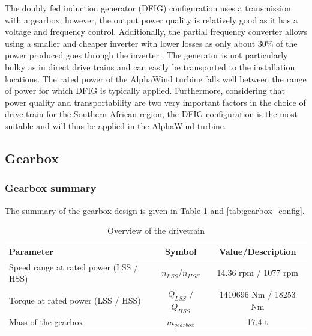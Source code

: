 The doubly fed induction generator (DFIG) configuration uses a transmission with a gearbox; however, the output power quality is relatively good as it has a voltage and frequency control. Additionally, the partial frequency converter allows using a smaller and cheaper inverter with lower losses as only about 30\% of the power produced goes through the inverter \cite{hau}. The generator is not particularly bulky as in direct drive trains and can easily be transported to the installation locations. The rated power of the AlphaWind turbine falls well between the range of power for which DFIG is typically applied. Furthermore, considering that power quality and transportability are two very important factors in the choice of drive train for the Southern African region, the DFIG configuration is the most suitable and will thus be applied in the AlphaWind turbine.


\subsection{Gearbox}

\subsubsection{Gearbox summary}

The summary of the gearbox design is given in Table \ref{tab:overview_drivetrain} and \ref{tab:gearbox_config}. 

\begin{table}[h]
\centering
\caption{Overview of the drivetrain}
\label{tab:overview_drivetrain}
\begin{tabular}{ |l|c|c| } 
\hline
\textbf{Parameter} & \textbf{Symbol} & \textbf{Value/Description}\\ 
\hline
Speed range at rated power (LSS / HSS) & $n_{LSS}$/$n_{HSS}$&  14.36 rpm / 1077 rpm \\ 
\hline
Torque at rated power (LSS / HSS) & $Q_{LSS}$ / $Q_{HSS}$ & 1410696 Nm / 18253 Nm\\
\hline
Mass of the gearbox & $m_{gearbox}$ & 17.4 t\\
\hline
\end{tabular} \\
\end{table}

